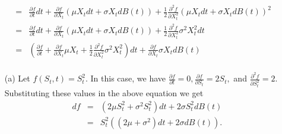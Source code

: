 \documentclass[11pt,twoside,reqno]{article}
\newcommand{\s}{\sigma}
\newcommand{\p}{\partial}
\begin{document}
\begin{itemize}
\begin{eqnarray*}
&=& \frac{\p f}{\p t} dt + \frac{\p f}{\p X_t} (\mu X_t dt + \s X_t dB(t)) + \frac{1}{2} \frac{\p^2 f}{\p X_t^2} (\mu X_t dt + \s X_t dB(t))^2 \\
&=& \frac{\p f}{\p t} dt + \frac{\p f}{\p X_t} (\mu X_t dt + \s X_t dB(t)) + \frac{1}{2} \frac{\p^2 f}{\p X_t^2} \s^2 X_t^2 dt \\
&=& \left( \frac{\p f}{\p t} + \frac{\p f}{\p X_t} \mu X_t + \frac{1}{2} \frac{\p^2 f}{\p X_t^2} \s^2 X_t^2 \right)dt + \frac{\p f}{\p X_t}  \s X_t dB(t)\\
\end{eqnarray*}
\begin{enumerate}
\item[(a)] Let $f(S_t, t) = S_t^2.$ In this case, we have $\frac{\p f}{\p t} = 0, \frac{\p f}{\p S_t} = 2S_t,$ and $ \frac{\p^2 f}{\p S_t^2} = 2$. Substituting these values in the above 
equation we get 
\begin{eqnarray*}
df &=&  (2\mu S_t^2 + \s^2 S_t^2 )dt + 2\s S_t^2 dB(t) \\
&=& S_t^2((2\mu + \s^2)dt + 2 \s dB(t)).
\end{eqnarray*}
\end{enumerate}
\end{itemize}
\end{document}

